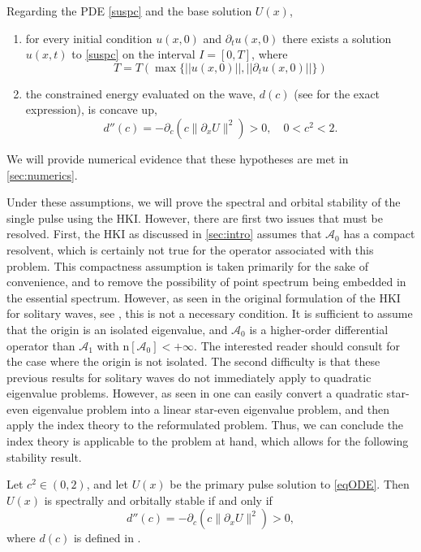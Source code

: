 \documentclass[review,onefignum,onetabnum]{siamart171218}
\newcommand{\rmn}{\mathrm{n}}
\newcommand{\calA}{\mathcal{A}}
\begin{document}
\begin{hypothesis}\label{PDEexisthyp}
Regarding the PDE \cref{suspc} and the base solution $U(x)$,
\begin{enumerate}
  \item for every initial condition $u(x,0)$ and $\partial_tu(x,0)$ there exists a solution $u(x, t)$ to \cref{suspc} on the interval $I = [0, T]$, where
      \[
      T=T\left(\max\{ ||u(x,0)||, ||\partial_tu(x,0)|| \}\right)
      \]
  \item the constrained energy evaluated on the wave, $d(c)$ (see \cite[Equation~(2.16)]{grillakis:sto87} for the exact expression), is concave up,
\begin{equation}\label{dcc}
d''(c) = -\partial_c\left( c\|\partial_xU\|^2 \right)>0,\quad0<c^2<2.
\end{equation}
\end{enumerate}
\end{hypothesis}
We will provide numerical evidence that these hypotheses are met in \cref{sec:numerics}.

Under these assumptions, we will prove the spectral and orbital stability of the single pulse using the HKI. However, there are first two issues that must be resolved. First, the HKI as discussed in \cref{sec:intro} assumes that $\calA_0$ has a compact resolvent, which is certainly not true for the operator associated with this problem. This compactness assumption is taken primarily for the sake of convenience, and to remove the possibility of point spectrum being embedded in the essential spectrum. However, as seen in the original formulation of the HKI for solitary waves, see \cite{kapitula:cev04,kapitula:ace05}, this is not a necessary condition. It is sufficient to assume that the origin is an isolated eigenvalue, and $\calA_0$ is a higher-order differential operator than $\calA_1$ with $\rmn[\calA_0]<+\infty$.  The interested reader should consult \cite{kapitula:ahk14} for the case where the origin is not isolated.
The second difficulty is that these previous results for solitary waves do not immediately apply to quadratic eigenvalue problems.  However, as seen in \cite[Section~4.1]{bronski:aii14} one can easily convert a quadratic star-even eigenvalue problem into a linear star-even eigenvalue problem, and then apply the index theory to the reformulated problem. Thus, we can conclude the index theory is applicable to the problem at hand, which allows for the following stability result.

\begin{lemma}\label{qstable}
Let $c^2 \in (0, 2)$, and let $U(x)$ be the primary pulse solution to \cref{eqODE}. Then $U(x)$ is spectrally and orbitally stable if and only if
\begin{equation}\label{dcc1}
d''(c) = -\partial_c\left( c\|\partial_x U\|^2 \right)>0,
\end{equation}
where $d(c)$ is defined in \cite[equation (2.16)]{grillakis:sto87}.
\end{lemma}
\end{document}
